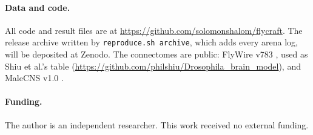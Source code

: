 \documentclass[11pt,a4paper]{article}
\begin{document}


\paragraph{Data and code.} All code and result files are at \url{https://github.com/solomonshalom/flycraft}. The release archive written by \texttt{reproduce.sh archive}, which adds every arena log, will be deposited at Zenodo. The connectomes are public: FlyWire v783 \citep{dorkenwald2024neuronal,schlegel2024whole}, used as Shiu et al.'s table (\url{https://github.com/philshiu/Drosophila_brain_model}), and MaleCNS v1.0 \citep{berg2026sexual}.

\paragraph{Funding.} The author is an independent researcher. This work received no external funding.

\normalsize
\end{document}
